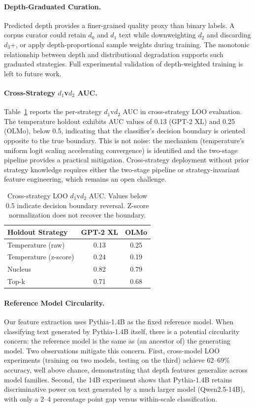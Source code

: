 \documentclass[11pt,a4paper]{article}
\begin{document}
\paragraph{Depth-Graduated Curation.}
Predicted depth provides a finer-grained quality proxy than binary labels. A corpus curator could retain $d_0$ and $d_1$ text while downweighting $d_2$ and discarding $d_3$+, or apply depth-proportional sample weights during training. The monotonic relationship between depth and distributional degradation supports such graduated strategies. Full experimental validation of depth-weighted training is left to future work.

\paragraph{Cross-Strategy $d_1$v$d_2$ AUC.}
Table~\ref{tab:d1v2_reversal} reports the per-strategy $d_1$v$d_2$ AUC in cross-strategy LOO evaluation. The temperature holdout exhibits AUC values of 0.13 (GPT-2 XL) and 0.25 (OLMo), below 0.5, indicating that the classifier's decision boundary is oriented opposite to the true boundary. This is not noise: the mechanism (temperature's uniform logit scaling accelerating convergence) is identified and the two-stage pipeline provides a practical mitigation. Cross-strategy deployment without prior strategy knowledge requires either the two-stage pipeline or strategy-invariant feature engineering, which remains an open challenge.

\begin{table}[t]
\centering
\caption{Cross-strategy LOO $d_1$v$d_2$ AUC. Values below 0.5 indicate decision boundary reversal. Z-score normalization does not recover the boundary.}
\label{tab:d1v2_reversal}
\small
\begin{tabular}{lcc}
\toprule
\textbf{Holdout Strategy} & \textbf{GPT-2 XL} & \textbf{OLMo} \\
\midrule
Temperature (raw) & 0.13 & 0.25 \\
Temperature (z-score) & 0.24 & 0.19 \\
Nucleus & 0.82 & 0.79 \\
Top-k & 0.71 & 0.68 \\
\bottomrule
\end{tabular}
\end{table}

\paragraph{Reference Model Circularity.}
Our feature extraction uses Pythia-1.4B as the fixed reference model. When classifying text generated by Pythia-1.4B itself, there is a potential circularity concern: the reference model is the same as (an ancestor of) the generating model. Two observations mitigate this concern. First, cross-model LOO experiments (training on two models, testing on the third) achieve 62--69\% accuracy, well above chance, demonstrating that depth features generalize across model families. Second, the 14B experiment shows that Pythia-1.4B retains discriminative power on text generated by a much larger model (Qwen2.5-14B), with only a 2--4 percentage point gap versus within-scale classification.
\end{document}
